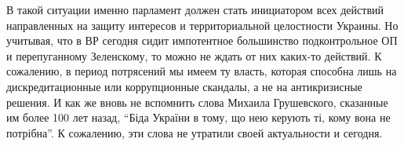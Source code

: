 В такой ситуации именно парламент должен стать инициатором всех действий
направленных на защиту интересов и территориальной целостности Украины. Но
учитывая, что в ВР сегодня сидит импотентное большинство подконтрольное ОП и
перепуганному Зеленскому, то можно не ждать от них каких-то действий. К
сожалению, в период потрясений мы имеем ту власть, которая способна лишь на
дискредитационные или коррупционные скандалы, а не на антикризисные решения. И
как же вновь не вспомнить слова Михаила Грушевского, сказанные им более 100 лет
назад, \enquote{Біда України в тому, що нею керують ті, кому вона не потрібна}.
К сожалению, эти слова не утратили своей актуальности и сегодня.
